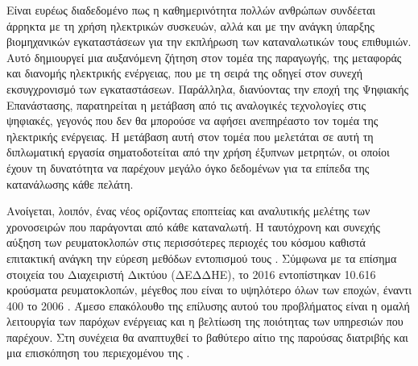 Είναι ευρέως διαδεδομένο πως η καθημερινότητα πολλών ανθρώπων συνδέεται άρρηκτα με τη χρήση ηλεκτρικών συσκευών, αλλά και με την ανάγκη ύπαρξης βιομηχανικών εγκαταστάσεων για την εκπλήρωση των καταναλωτικών τους επιθυμιών. Αυτό δημιουργεί μια αυξανόμενη ζήτηση στον τομέα της παραγωγής, της μεταφοράς και διανομής ηλεκτρικής ενέργειας, που με τη σειρά της οδηγεί στον συνεχή εκσυγχρονισμό των εγκαταστάσεων. Παράλληλα, διανύοντας την εποχή της Ψηφιακής Επανάστασης, παρατηρείται η μετάβαση από τις αναλογικές τεχνολογίες στις ψηφιακές, γεγονός που δεν θα μπορούσε να αφήσει ανεπηρέαστο τον τομέα της ηλεκτρικής ενέργειας. Η μετάβαση αυτή στον τομέα που μελετάται σε αυτή τη διπλωματική εργασία σηματοδοτείται από την χρήση έξυπνων μετρητών, οι οποίοι έχουν τη δυνατότητα να παρέχουν μεγάλο όγκο δεδομένων για τα επίπεδα της κατανάλωσης κάθε πελάτη.\par
Ανοίγεται, λοιπόν, ένας νέος ορίζοντας εποπτείας και αναλυτικής μελέτης των χρονοσειρών που παράγονται από κάθε καταναλωτή. Η ταυτόχρονη και συνεχής αύξηση των ρευματοκλοπών στις περισσότερες περιοχές του κόσμου καθιστά επιτακτική ανάγκη την εύρεση μεθόδων εντοπισμού τους . Σύμφωνα με τα επίσημα στοιχεία του Διαχειριστή Δικτύου (ΔΕΔΔΗΕ), το 2016 εντοπίστηκαν 10.616 κρούσματα ρευματοκλοπών, μέγεθος που είναι το υψηλότερο όλων των εποχών, έναντι 400 το 2006 \cite{energypress}. Άμεσο επακόλουθο της επίλυσης αυτού του προβλήματος είναι η ομαλή λειτουργία των παρόχων ενέργειας και η βελτίωση της ποιότητας των υπηρεσιών που παρέχουν. Στη συνέχεια θα αναπτυχθεί το βαθύτερο αίτιο της παρούσας διατριβής και μια επισκόπηση του περιεχομένου της \cite{theftanalysis}.
